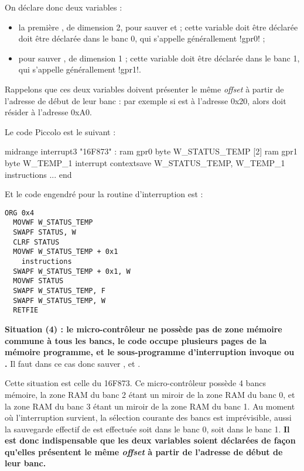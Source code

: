 On déclare donc deux variables :
\begin{itemize}
  \item la première , de dimension 2, pour sauver  et  ; cette variable doit être déclarée doit être déclarée dans le banc 0, qui s'appelle générallement \pic!gpr0! ; 
  \item {} pour sauver , de dimension 1 ; cette variable doit être déclarée dans le banc 1, qui s'appelle générallement \pic!gpr1!.

\end{itemize}

Rappelons que ces deux variables doivent présenter le même \emph{offset} à partir de l'adresse de début de leur banc : par exemple si  est à l'adresse 0x20, alors  doit résider à l'adresse 0xA0.

Le code Piccolo est le suivant :
\begin{piccolo}
midrange interrupt3 "16F873" :
ram gpr0 {
  byte W_STATUS_TEMP [2]
}
ram gpr1 {
  byte W_TEMP_1
}
interrupt contextsave W_STATUS_TEMP, W_TEMP_1 {
  instructions
}
...
end
\end{piccolo}

Et le code engendré pour la routine d'interruption est :
\begin{lstlisting}[language=assembleur]
  ORG 0x4
  MOVWF W_STATUS_TEMP
  SWAPF STATUS, W
  CLRF STATUS
  MOVWF W_STATUS_TEMP + 0x1
    instructions
  SWAPF W_STATUS_TEMP + 0x1, W
  MOVWF STATUS
  SWAPF W_STATUS_TEMP, F
  SWAPF W_STATUS_TEMP, W
  RETFIE
\end{lstlisting}





\textbf{Situation (4) : le micro-contrôleur ne possède pas de zone mémoire commune à tous les bancs, le code occupe plusieurs pages de la mémoire programme, et le sous-programme d'interruption invoque  ou .} Il faut dans ce cas donc sauver ,  et .

Cette situation est celle du 16F873. Ce micro-contrôleur possède 4 bancs mémoire, la zone RAM du banc 2 étant un miroir de la zone RAM du banc 0, et la zone RAM du banc 3 étant un miroir de la zone RAM du banc 1. Au moment où l'interruption survient, la sélection courante des bancs est imprévisible, aussi la sauvegarde effectif de  est effectuée soit dans le banc 0, soit dans le banc 1. \textbf{Il est donc indispensable que les deux variables soient déclarées de façon qu'elles présentent le même \emph{offset} à partir de l'adresse de début de leur banc.}

